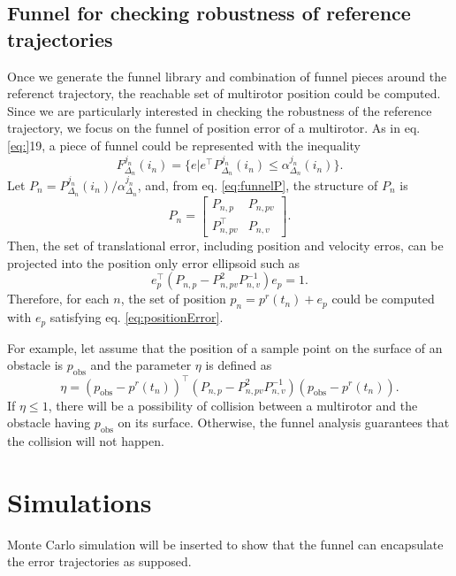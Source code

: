\documentclass[letterpaper, 10 pt, conference]{ieeeconf}  %
\begin{document}
\subsection{Funnel for checking robustness of reference trajectories}
Once we generate the funnel library and combination of funnel pieces around the referenct trajectory, the reachable set of multirotor position could be computed. Since we are particularly interested in checking the robustness of the reference trajectory, we focus on the funnel of position error of a multirotor.
As in eq. \eqref{eq:}19, a piece of funnel could be represented with the inequality 
\begin{equation}
F_{\Delta_n}^{j_n}(i_n) = \{e|e^\top P_{\Delta_n}^{j_n}(i_n) \leq \alpha_{\Delta_n}^{j_n}(i_n)\}. \nonumber
\end{equation} 
Let $P_n = P_{\Delta_n}^{j_n}(i_n) / \alpha_{\Delta_n}^{j_n}$, and, from eq. \eqref{eq:funnelP}, the structure of $P_n$ is
\begin{equation}
P_n = \left[
\begin{array}{cc}
P_{n,p} & P_{n,pv} \\
P_{n,pv}^\top & P_{n,v} 
\end{array}
\right]. \nonumber
\end{equation}
Then, the set of translational error, including position and velocity erros, can be projected into the position only error ellipsoid such as
\begin{equation}
e_p^\top (P_{n,p} - P_{n,pv}^2 P_{n,v}^{-1}) e_p = 1. \label{eq:positionError}
\end{equation}
Therefore, for each $n$, the set of position $p_n = p^r(t_n) + e_p$ could be computed with $e_p$ satisfying eq. \eqref{eq:positionError}.  

For example, let assume that the position of a sample point on the surface of an obstacle is $p_\text{obs}$ and the parameter $\eta$ is defined as 
\begin{equation}
\eta = (p_\text{obs}-p^r(t_n))^\top (P_{n,p} - P_{n,pv}^2 P_{n,v}^{-1})(p_\text{obs}-p^r(t_n)). \nonumber
\end{equation}
If $\eta \leq 1$, there will be a possibility of collision between a multirotor and the obstacle having $p_\text{obs}$ on its surface. Otherwise, the funnel analysis guarantees that the collision will not happen. 

\section{Simulations}
Monte Carlo simulation will be inserted to show that the funnel can encapsulate the error trajectories as supposed. 
\end{document}
